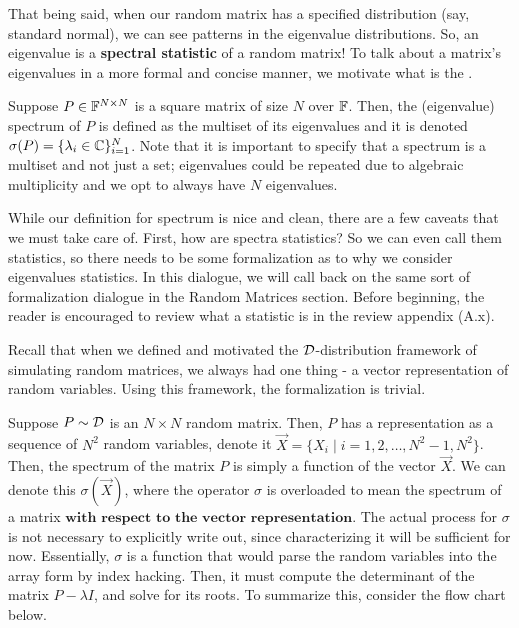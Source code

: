 That being said, when our random matrix has a specified distribution (say, standard normal), we can see patterns in the eigenvalue distributions. So, an eigenvalue is a \textbf{spectral statistic} of a random matrix! To talk about a matrix's eigenvalues in a more formal and concise manner, we motivate what is the .

\newpage

\begin{definition}[Spectrum]
Suppose $P \in \mathbb{F}^{N \times N}$ is a square matrix of size $N$ over $\mathbb{F}$. Then, the (eigenvalue) spectrum of $P$ is defined as the multiset of its eigenvalues and it is denoted $\sigma(P) = \{\lambda_i  \in \mathbb{C}\}_{i=1}^N$. Note that it is important to specify that a spectrum is a multiset and not just a set; eigenvalues could be repeated due to algebraic multiplicity and we opt to always have $N$ eigenvalues. 
\end{definition}

While our definition for spectrum is nice and clean, there are a few caveats that we must take care of. First, how are spectra statistics? So we can even call them statistics, so there needs to be some formalization as to why we consider eigenvalues statistics. In this dialogue, we will call back on the same sort of formalization dialogue in the Random Matrices section. Before beginning, the reader is encouraged to review what a statistic is in the review appendix (A.x).

Recall that when we defined and motivated the $\mathcal{D}$-distribution framework of simulating random matrices, we always had one thing - a vector representation of random variables. Using this framework, the formalization is trivial.

\begin{remark}[Formalization]
Suppose $P \sim \mathcal{D}$ is an $N \times N$ random matrix. Then, $P$ has a representation as a sequence of $N^2$ random variables, denote it $\vec{X} = \{X_i \mid i = 1,2,\dots,N^2 - 1,N^2\}$. Then, the spectrum of the matrix $P$ is simply a function of the vector $\vec{X}$. We can denote this $\sigma(\vec{X})$, where the operator $\sigma$ is overloaded to mean the spectrum of a matrix $\textbf{with respect to the vector representation}$. The actual process for $\sigma$ is not necessary to explicitly write out, since characterizing it will be sufficient for now. Essentially, $\sigma$ is a function that would parse the random variables into the array form by index hacking. Then, it must compute the determinant of the matrix $P - \lambda I$, and solve for its roots. To summarize this, consider the flow chart below.
\end{remark}


